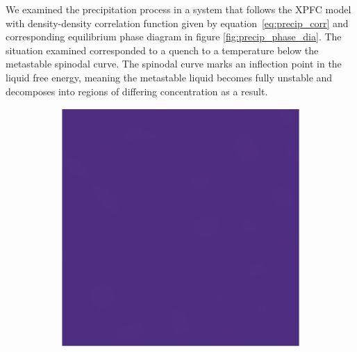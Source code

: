 \documentclass[showkeys, prb, reprint]{revtex4-1}
\begin{document}
We examined the precipitation process in a system that follows the XPFC model
with {\color{red} density-density correlation function given by equation~\ref{eq:precip_corr} and} corresponding equilibrium phase diagram in figure
\ref{fig:precip_phase_dia}. The situation examined corresponded to a quench to
a temperature below the metastable spinodal curve. The spinodal curve marks an
inflection point in the liquid free energy, meaning the metastable liquid
becomes fully unstable and decomposes into regions of differing concentration
as a result.
%
\begin{figure}
    \centering
    \begin{subfigure}[b]{0.2\textwidth}
        \includegraphics[width=\textwidth]{initial}
        \label{fig:initial}
        \caption{}
    \end{subfigure}
    ~
    \begin{subfigure}[b]{0.2\textwidth}

\end{subfigure}
\end{figure}
\end{document}
